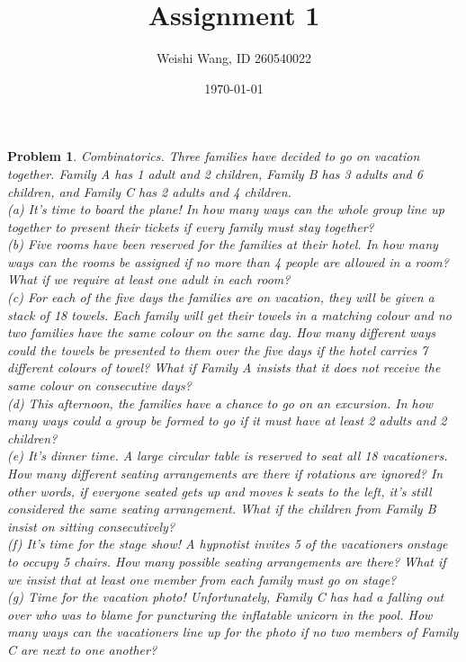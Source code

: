 \documentclass{article}
\newtheorem{problem}{Problem}
\theoremstyle{definition}
\begin{document}
 \title{Assignment 1} 

\author{Weishi Wang, ID 260540022} 

\date{\today}

\maketitle

\begin{problem} 
Combinatorics. Three families have decided to go on vacation together. Family A has 1
adult and 2 children, Family B has 3 adults and 6 children, and Family C has 2 adults and 4
children.\\

(a) It's time to board the plane! In how many ways can the whole group line up together to
present their tickets if every family must stay together?\\

(b) Five rooms have been reserved for the families at their hotel. In how many ways can the
rooms be assigned if no more than 4 people are allowed in a room? What if we require
at least one adult in each room?\\

(c) For each of the five days the families are on vacation, they will be given a stack of 18
towels. Each family will get their towels in a matching colour and no two families have
the same colour on the same day. How many different ways could the towels be presented
to them over the five days if the hotel carries 7 different colours of towel? What if Family
A insists that it does not receive the same colour on consecutive days?\\

(d) This afternoon, the families have a chance to go on an excursion. In how many ways
could a group be formed to go if it must have at least 2 adults and 2 children?\\

(e) It's dinner time. A large circular table is reserved to seat all 18 vacationers. How
many different seating arrangements are there if rotations are ignored? In other words,
if everyone seated gets up and moves k seats to the left, it's still considered the same
seating arrangement. What if the children from Family B insist on sitting consecutively?\\

(f) It's time for the stage show! A hypnotist invites 5 of the vacationers onstage to occupy
5 chairs. How many possible seating arrangements are there? What if we insist that at
least one member from each family must go on stage?\\

(g) Time for the vacation photo! Unfortunately, Family C has had a falling out over who
was to blame for puncturing the inflatable unicorn in the pool. How many ways can the
vacationers line up for the photo if no two members of Family C are next to one another?\\\\\\

\end{problem}
\end{document}
